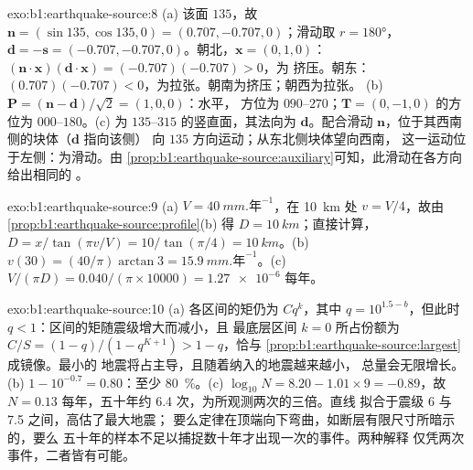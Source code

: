 \begin{solution}{exo:b1:earthquake-source:8}
(a) 该面 $135$，故 $\mathbf n = (\sin135, \cos135, 0) =
(0.707, -0.707, 0)$；滑动取 $r = \ang{180}$，$\mathbf d = -\mathbf s
= (-0.707, -0.707, 0)$。朝北，$\mathbf x = (0, 1, 0)$：
$(\mathbf n\cdot\mathbf x)(\mathbf d\cdot\mathbf x) = (-0.707)(-0.707) > 0$，为
挤压。朝东：$(0.707)(-0.707) < 0$，为拉张。朝南为挤压；朝西为拉张。
(b) $\mathbf P = (\mathbf n - \mathbf d)/\sqrt2 = (1, 0, 0)$：水平，
方位为 $090$--$270$；$\mathbf T = (0, -1, 0)$ 的方位为
$000$--$180$。(c) 为 $135$--$315$ 的竖直面，其法向为
$\mathbf d$。配合滑动 $\mathbf n$，位于其西南侧的块体（$\mathbf d$ 指向该侧）
向 $135$ 方向运动；从东北侧块体望向西南，
这一运动位于左侧：为滑动。由
\cref{prop:b1:earthquake-source:auxiliary}可知，此滑动在各方向给出相同的
。
\end{solution}

\begin{solution}{exo:b1:earthquake-source:9}
(a) $V = \qty{40}{mm.\text{年}^{-1}}$，在 \qty{10}{km} 处 $v = V/4$，故由
\cref{prop:b1:earthquake-source:profile}(b) 得 $D = \qty{10}{km}$；直接计算，
$D = x/\tan(\pi v/V) = 10/\tan(\pi/4) = \qty{10}{km}$。(b) $v(30) =
(40/\pi)\arctan 3 = \qty{15.9}{mm.\text{年}^{-1}}$。(c) $V/(\pi D) =
\num{0.040}/(\pi\times\num{10000}) = \num{1.27e-6}$ 每年。
\end{solution}

\begin{solution}{exo:b1:earthquake-source:10}
(a) 各区间的矩仍为 $C q^k$，其中 $q = 10^{1.5 - b}$，但此时
$q < 1$：区间的矩随震级增大而减小，且
最底层区间 $k = 0$ 所占份额为 $C/S = (1 - q)/(1 - q^{K+1}) > 1 - q$，恰与
\cref{prop:b1:earthquake-source:largest}成镜像。最小的
地震将占主导，且随着纳入的地震越来越小，
总量会无限增长。(b) $1 - 10^{-0.7} = 0.80$：至少
\qty{80}{\percent}。(c) $\log_{10}N = 8.20 - 1.01\times9 = -0.89$，故 $N = 0.13$
每年，五十年约 6.4 次，为所观测两次的三倍。直线
拟合于震级 6 与 7.5 之间，高估了最大地震；
要么定律在顶端向下弯曲，如断层有限尺寸所暗示的，要么
五十年的样本不足以捕捉数十年才出现一次的事件。两种解释
仅凭两次事件，二者皆有可能。
\end{solution}

